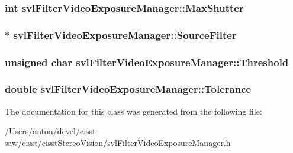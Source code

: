 \subsubsection[{Max\+Shutter}]{\setlength{\rightskip}{0pt plus 5cm}int svl\+Filter\+Video\+Exposure\+Manager\+::\+Max\+Shutter\hspace{0.3cm}{\ttfamily [protected]}}\label{classsvl_filter_video_exposure_manager_a0c93ed7790f14669fdf52207f0a1105e}
\hypertarget{classsvl_filter_video_exposure_manager_a1465c2428b76152bd3397825a1d4163b}{}
\subsubsection[{Source\+Filter}]{$\ast$ svl\+Filter\+Video\+Exposure\+Manager\+::\+Source\+Filter\hspace{0.3cm}{\ttfamily [protected]}}\label{classsvl_filter_video_exposure_manager_a1465c2428b76152bd3397825a1d4163b}
\hypertarget{classsvl_filter_video_exposure_manager_ab2fc8e4a7d94af1976849d160ac946ba}{}
\subsubsection[{Threshold}]{\setlength{\rightskip}{0pt plus 5cm}unsigned char svl\+Filter\+Video\+Exposure\+Manager\+::\+Threshold\hspace{0.3cm}{\ttfamily [protected]}}\label{classsvl_filter_video_exposure_manager_ab2fc8e4a7d94af1976849d160ac946ba}
\hypertarget{classsvl_filter_video_exposure_manager_ade971b6b43879957865e69fb76a045e3}{}
\subsubsection[{Tolerance}]{\setlength{\rightskip}{0pt plus 5cm}double svl\+Filter\+Video\+Exposure\+Manager\+::\+Tolerance\hspace{0.3cm}{\ttfamily [protected]}}\label{classsvl_filter_video_exposure_manager_ade971b6b43879957865e69fb76a045e3}


The documentation for this class was generated from the following file\+:\begin{DoxyCompactItemize}
\item 
/\+Users/anton/devel/cisst-\/saw/cisst/cisst\+Stereo\+Vision/\hyperlink{svl_filter_video_exposure_manager_8h}{svl\+Filter\+Video\+Exposure\+Manager.\+h}\end{DoxyCompactItemize}
